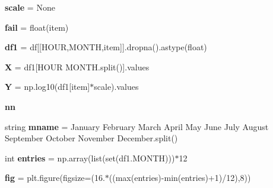 \begin{DoxyCompactItemize}
{\bfseries scale} = None
\item 
\mbox{\label{namespacedsmacc_1_1observations_1_1get__diurnal_a4a83c10c18852c5bbdc39097290acda3}} 
{\bfseries fail} = float(item)
\item 
\mbox{\label{namespacedsmacc_1_1observations_1_1get__diurnal_a1e5c6d9ef2f710a54393939de4b81fed}} 
{\bfseries df1} = df\mbox{[}\mbox{[}\textquotesingle{}H\+O\+UR\textquotesingle{},\textquotesingle{}M\+O\+N\+TH\textquotesingle{},item\mbox{]}\mbox{]}.dropna().astype(float)
\item 
\mbox{\label{namespacedsmacc_1_1observations_1_1get__diurnal_aee925ef8db1b9593b772813a5a4d30a7}} 
{\bfseries X} = df1\mbox{[}\textquotesingle{}H\+O\+UR M\+O\+N\+TH\textquotesingle{}.split()\mbox{]}.values
\item 
\mbox{\label{namespacedsmacc_1_1observations_1_1get__diurnal_a9a3fe2c4578c23e9daafc57a7b2bead2}} 
{\bfseries Y} = np.\+log10(df1\mbox{[}item\mbox{]}$\ast$scale).values
\item 
{\bfseries nn}
\item 
\mbox{\label{namespacedsmacc_1_1observations_1_1get__diurnal_a029cd852e32ae7dd3c9dbcc9d4ba5d28}} 
string {\bfseries mname} = \textquotesingle{}January February March April May June July August September October November December\textquotesingle{}.split()
\item 
\mbox{\label{namespacedsmacc_1_1observations_1_1get__diurnal_a3cc14a7ec95219828dd99c17d0665a44}} 
int {\bfseries entries} = np.\+array(list(set(df1.\+M\+O\+N\+TH)))$\ast$12
\item 
\mbox{\label{namespacedsmacc_1_1observations_1_1get__diurnal_a5129c11bfed74eb88568ab75d129d45a}} 
{\bfseries fig} = plt.\+figure(figsize=(16.$\ast$((max(entries)-\/min(entries)+1)/12),8))
\item 
\mbox{\label{namespacedsmacc_1_1observations_1_1get__diurnal_a80ea9ae952f10e1c91eb0ebd9a505faf}} 

\end{DoxyCompactItemize}
